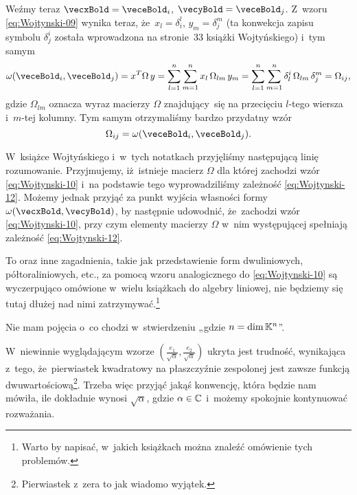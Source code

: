 \documentclass[a4paper,11pt]{article}
\numberwithin{equation}{section}
\begin{document}
Weźmy teraz $\vecxBold = \veceBold_{ i }$, $\vecyBold = \veceBold_{ j }$.
Z~wzoru \eqref{eq:Wojtynski-09} wynika teraz, że~$x_{ l } = \delta^{ l }_{ i }$,
$y_{ m } = \delta^{ m }_{ j }$ (ta konwekcja zapisu symbolu $\delta^{ i }_{ j }$ została
wprowadzona na stronie~33 książki Wojtyńskiego) i~tym samym
\begin{equation}
  \label{eq:Wojtynski-11}
  \omega( \veceBold_{ i }, \veceBold_{ j } ) = x^{ T } \Omega \, y =
  \sum_{ l = 1 }^{ n } \sum_{ m = 1 }^{ n } x_{ l } \, \Omega_{ l m } \, y_{ m } =
  \sum_{ l = 1 }^{ n } \sum_{ m = 1 }^{ n } \delta^{ i }_{ l } \, \Omega_{ l m } \, \delta^{ m }_{ j } =
  \Omega_{ i j },
\end{equation}
gdzie $\Omega_{ l m }$ oznacza wyraz macierzy $\Omega$ znajdujący~się na przecięciu
$l$-tego wiersza i~$m$-tej kolumny. Tym samym otrzymaliśmy bardzo przydatny
wzór
\begin{equation}
  \label{eq:Wojtynski-12}
  \Omega_{ i j } = \omega( \veceBold_{ i }, \veceBold_{ j } ).
\end{equation}

W~książce Wojtyńskiego i~w~tych notatkach przyjęliśmy następującą linię
rozumowanie. Przyjmujemy, iż~istnieje macierz $\Omega$ dla której zachodzi wzór
\eqref{eq:Wojtynski-10} i~na podstawie tego wyprowadziliśmy zależność
\eqref{eq:Wojtynski-12}. Możemy jednak przyjąć za punkt wyjścia własności
formy $\omega( \vecxBold, \vecyBold )$, by następnie udowodnić, że~zachodzi wzór
\eqref{eq:Wojtynski-10}, przy czym elementy macierzy $\Omega$ w~nim występującej
spełniają zależność \eqref{eq:Wojtynski-12}.

To oraz inne zagadnienia, takie jak przedstawienie form dwuliniowych,
półtoraliniowych, etc., za pomocą wzoru analogicznego do
\eqref{eq:Wojtynski-10} są wyczerpująco omówione w~wielu książkach do
algebry liniowej, nie będziemy się tutaj dłużej nad nimi
zatrzymywać.\footnote{Warto by napisać, w~jakich książkach można znaleźć
  omówienie tych problemów.}

\VerSpaceFour




\noindent
{} Nie mam pojęcia o~co chodzi w~stwierdzeniu
„gdzie $n = \dim \mathbb{K}^{ n }$”.

\VerSpaceFour





\noindent
{} W~niewinnie wyglądającym wzorze $\left(
  \frac{ e_{ 1 } }{ \sqrt{ \alpha } }, \frac{ e_{ 2 } }{ \sqrt{ \alpha } } \right)$
ukryta jest trudność, wynikająca z~tego, że~pierwiastek kwadratowy na
płaszczyźnie zespolonej jest zawsze funkcją
dwuwartościową\footnote{Pierwiastek z~zera to jak wiadomo wyjątek.}.
Trzeba więc przyjąć jakąś konwencję, która będzie nam mówiła, ile dokładnie
wynosi $\sqrt{ \alpha }$, gdzie $\alpha \in \mathbb{C}$ i~możemy spokojnie kontynuować
rozważania.
\end{document}
